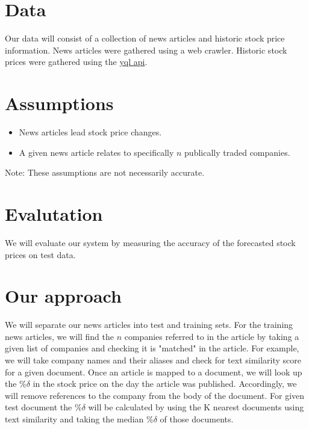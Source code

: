 \documentclass[11pt,letterpaper]{article}
\newcommand{\blue}[1]{\textcolor{RoyalBlue}{#1}}
\newcommand{\instructions}[1]{\blue{\textit{#1}}}
\renewcommand{\instructions}[1]{}
\begin{document}
\section*{Data}
  Our data will consist of a collection of news articles and historic
  stock price information. News articles were gathered using a web crawler.
  Historic stock prices were gathered using the
  \href{https://developer.yahoo.com/yql}{yql api}.

\section*{Assumptions}
  \begin{itemize}
  \item News articles lead stock price changes.
  \item A given news article relates to specifically $n$ publically traded companies.
  \end{itemize}
  Note: These assumptions are not necessarily accurate.

\instructions{Do you have data to train and test your system on? How
  will you evaluate your system?}

\section*{Evalutation}
  We will evaluate our system by measuring the accuracy of the forecasted
  stock prices on test data.

\section*{Our approach}
  We will separate our news articles into test and training sets. For the training news
  articles, we will find the $n$ companies referred to in the article by taking a given
  list of companies and checking it is "matched" in the article. For example, we will
  take company names and their aliases and check for text similarity score for a given
  document. Once an article is mapped to a document, we will look up the $\%\delta$ in
  the stock price on the day the article was published. Accordingly, we will remove references
  to the company from the body of the document. For given test document the $\%\delta$
  will be calculated by using the K nearest documents using text similarity
  and taking the median $\%\delta$ of those documents.
\instructions{Describe how you want to tackle this task}
\end{document}

